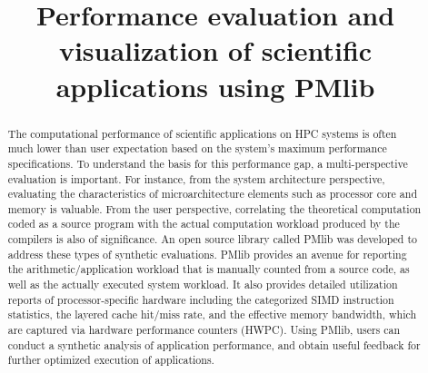 \documentclass[conference]{IEEEtran}
\begin{document}
\title{
%
%
Performance evaluation and visualization of scientific applications using PMlib
}

\author{
\and
{}
\and
{}
}

\maketitle

\begin{abstract}
The computational performance of scientific applications on HPC systems
is often much lower than user expectation based on the system's maximum
performance specifications.
To understand the basis for this performance gap, a multi-perspective
evaluation is important.
For instance, from the system architecture perspective,
evaluating the characteristics of microarchitecture elements such as
processor core and memory is valuable.
From the user perspective, correlating the theoretical computation coded
as a source program with the actual computation workload produced by the
compilers is also of significance.
An open source library called PMlib was developed to address these types
of synthetic evaluations.
PMlib provides an avenue for reporting the arithmetic/application workload
that is manually counted from a source code,
as well as the actually executed system workload.
It also provides detailed utilization reports of processor-specific hardware
including the categorized SIMD instruction statistics, the layered cache
hit/miss rate, and the effective memory bandwidth,
which are captured via hardware performance counters (HWPC).
Using PMlib, users can conduct a synthetic analysis of application
performance, and obtain useful feedback for further optimized execution
of applications.
\end{abstract}
\end{document}
